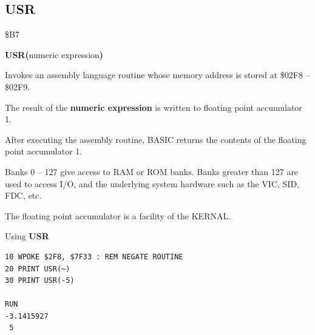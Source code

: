 \subsection{USR}
\begin{description}[leftmargin=2cm,style=nextline]
\item [Token:]    \$B7

\item [Format:]   {\bf USR(}numeric expression{\bf)}

\item [Usage:]    Invokes an assembly language routine whose memory address is stored at  \$02F8 -- \$02F9.

                  The result of the {\bf numeric expression} is written to floating point accumulator 1.

                  After executing the assembly routine, BASIC returns the contents of the floating point accumulator 1.

\item [Remarks:]  Banks 0 -- 127 give access to RAM or ROM banks. Banks greater than 127 are used to access I/O, and the underlying system hardware such as the VIC, SID, FDC, etc.

                  The floating point accumulator is a facility of the KERNAL.

\item [Example:]  Using {\bf USR}

\begin{tcolorbox}[colback=black,coltext=white]
\verbatimfont{\codefont}
\begin{verbatim}
10 WPOKE $2F8, $7F33 : REM NEGATE ROUTINE
20 PRINT USR(~)
30 PRINT USR(-5)

RUN
-3.1415927
 5
\end{verbatim}
\end{tcolorbox}
\end{description}


\newpage
